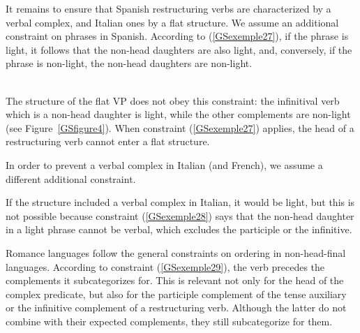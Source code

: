 {It remains to ensure that Spanish restructuring verbs are characterized by a verbal complex, and Italian ones by a flat structure. We assume an additional constraint on phrases in Spanish. According to (\ref{GSexemple27}), if the phrase is light, it follows that the non-head daughters are also light, and, conversely, if the phrase is non-light, the non-head daughters are non-light.

\ea	
\label{GSexemple27}
 \impl\\
\z
The structure of the flat VP does not obey this constraint: the infinitival verb which is a non-head daughter is light, while the other complements are non-light (see Figure~\ref{GSfigure4}). When constraint (\ref{GSexemple27}) applies, the head of a restructuring verb cannot enter a flat structure. 

In order to prevent a verbal complex in Italian (and French), we assume a different additional constraint.

\begin{exe}
\end{exe}

If the structure included a verbal complex in Italian, it would be light, but this is not possible because constraint (\ref{GSexemple28}) says that the non-head daughter in a light phrase cannot be verbal, which excludes the participle or the infinitive.

Romance languages follow the general constraints on ordering in non-head-final languages. According to constraint (\ref{GSexemple29}), the verb precedes the complements it subcategorizes for. This is relevant not only for the head of the complex predicate, but also for the participle complement of the tense auxiliary or the infinitive complement of a restructuring verb. Although the latter do not combine with their expected complements, they still subcategorize for them.  

}

